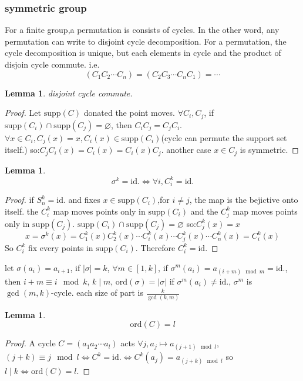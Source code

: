 \documentclass[10pt,a4paper]{article}
\newtheorem{lemma}[theorem]{Lemma}
\begin{document}
\subsubsection{symmetric group}
For a finite group,a permutation is consists of cycles. In the other word, any permutation can write to disjoint cycle decomposition.
For a permutation, the cycle decomposition is unique, but each elements in cycle and the product of disjoin cycle commute. i.e.
\[(C_1C_2\cdots C_n)=(C_2C_3\cdots C_nC_1)=\cdots\]

\begin{lemma}
    disjoint cycle commute.
\end{lemma}

\begin{proof}
    Let $\mathrm{supp}(C)$ donated the point moves. $\forall C_i,C_j$, if $\mathrm{supp}(C_i)\cap\mathrm{supp}(C_j)=\varnothing$, 
    then $C_iC_j=C_jC_i$. $\forall x\in C_i,C_j(x)=x,C_i(x)\in\mathrm{supp}(C_i)$(cycle can permute the support set itself.) 
    so:$C_jC_i(x)=C_i(x)=C_i(x)C_j$. another case $x\in C_j$ is symmetric.
\end{proof}
 
\begin{lemma}
    \[\sigma^k=\mathrm{id.}\iff\forall i,C_i^k=\mathrm{id.}\]
\end{lemma}

\begin{proof}
    if $S_{n}^{k}=\mathrm{id.}$ and fixes $x\in\mathrm{supp}(C_i)$,for $i\ne j$, the map is the bejictive onto itself.
    the $C_i^k$ map moves points only in $\mathrm{supp}(C_i)$ and the $C_j^k$ map moves points only in $\mathrm{supp}(C_j)$. $\mathrm{supp}(C_i)\cap\mathrm{supp}(C_j)=\varnothing$
    so:$C_j^k(x)=x$\[x=\sigma^k(x)=C_1^k(x)C_2^k(x)\cdots C_i^k(x)\cdots C_j^k(x)\cdots C_n^k(x)=C_i^k(x)\]
    So $C_i^k$ fix every points in $\mathrm{supp}(C_i)$. Therefore $C_i^k=\mathrm{id.}$
\end{proof}

let $\sigma(a_i)=a_{i+1}$, if $|\sigma|=k$, $\forall m\in[1,k]$, if $\sigma^m(a_i)=a_{(i+m)\mod m}=\mathrm{id.}$, then $i+m\equiv i\mod k$, $k\mid m$, $\mathrm{ord}(\sigma)=|\sigma|$
if $\sigma^m(a_i)\ne\mathrm{id.}$, $\sigma^m$ is $\gcd(m,k)$-cycle. each size of part is $\frac{k}{\gcd(k,m)}$

\begin{lemma}
    \[\mathrm{ord}(C)=l\]
\end{lemma}

\begin{proof}
    A cycle $C=(a_1a_2\cdots a_l)$ acts $\forall j,a_j\mapsto a_{(j+1)\mod l}$,$(j+k)\equiv j\mod l\iff C^k=\mathrm{id.}\iff C^k(a_j)=a_{(j+k)\mod l}$
    so $l\mid k\iff\mathrm{ord}(C)=l$.
\end{proof}
\end{document}
